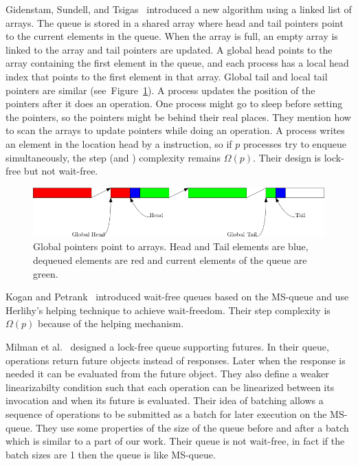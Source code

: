 \documentclass[10pt]{article}
\newcommand{\nf}[1]{{\normalfont{\texttt{#1}}}}
\theoremstyle{definition}
\begin{document}
Gidenstam, Sundell, and Tsigas~\cite{DBLP:conf/opodis/GidenstamST10} introduced a new algorithm using a linked list of arrays. The queue is stored in a shared array where head and tail pointers point to the current elements in the queue. When the array is full, an empty array is linked to the array and tail pointers are updated. A global head points to the array containing the first element in the queue, and each process has a local head index that points to the first element in that array. Global tail and local tail pointers are similar (see~Figure~\ref{fig::sundell}). A process updates the position of the pointers after it does an operation. One process might go to sleep before setting the pointers, so the pointers might be behind their real places. They mention how to scan the arrays to update pointers while doing an operation. A process writes an element in the location head by a \nf{CAS} instruction, so if $p$ processes try to enqueue simultaneously, the step (and \nf{CAS}) complexity remains $\Omega(p)$. Their design is lock-free but not wait-free.

\begin{figure}[hbt]
  \center\includegraphics[scale=0.5]{pics/sundell}
    \caption{\label{fig::sundell}Global pointers point to arrays. Head and Tail elements are blue, dequeued elements are red and current elements of the queue are green.}
\end{figure}

Kogan and Petrank~\cite{DBLP:conf/ppopp/KoganP11} introduced wait-free queues based on the MS-queue and use Herlihy's helping technique to achieve wait-freedom. Their step complexity is $\Omega(p)$ because of the helping mechanism.

Milman et al.~\cite{DBLP:conf/spaa/MilmanKLLP18} designed a lock-free queue supporting futures. In their queue, operations  return future objects instead of responses. Later when the response is needed it can be evaluated from the future object. They also define a weaker linearizabilty condition such that each operation can be linearized between its invocation and when its future is evaluated. Their idea of batching allows a sequence of operations to be submitted as a batch for later execution on the MS-queue. They use some properties of the size of the queue before and after a batch which is similar to a part of our work. Their queue is not wait-free, in fact if the batch sizes are 1 then the queue is like MS-queue.
\end{document}
